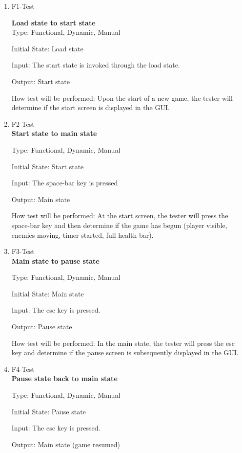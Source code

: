 \documentclass[12pt, titlepage]{article}
\begin{document}
\begin{enumerate}

\item{F1-Test}

\textbf{Load state to start state} \\
Type: Functional, Dynamic, Manual
					
Initial State: Load state
					
Input: The start state is invoked through the load state.
					
Output: Start state
					
How test will be performed: Upon the start of a new game, the tester will determine if the start screen is displayed in the GUI.
					
\item{F2-Test} \\
\textbf{Start state to main state}

Type: Functional, Dynamic, Manual
					
Initial State: Start state
					
Input: The space-bar key is pressed
					
Output: Main state
					
How test will be performed: At the start screen, the tester will press the space-bar key and then determine if the game has begun (player visible, enemies moving, timer started, full health bar).

\item{F3-Test} \\
\textbf{Main state to pause state}

Type: Functional, Dynamic, Manual
					
Initial State: Main state
					
Input: The esc key is pressed.
					
Output: Pause state
					
How test will be performed: In the main state, the tester will press the esc key and determine if the pause screen is subsequently displayed in the GUI.

\item{F4-Test} \\
\textbf{Pause state back to main state}

Type: Functional, Dynamic, Manual
					
Initial State: Pause state
					
Input: The esc key is pressed.
					
Output: Main state (game resumed)
					

\end{enumerate}
\end{document}
